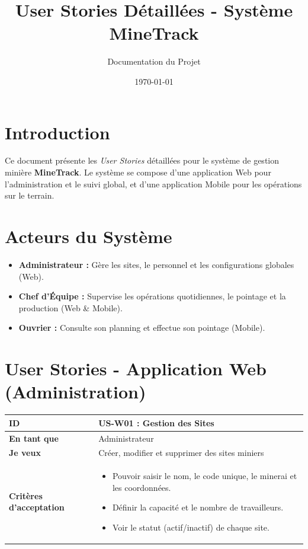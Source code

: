 \documentclass[12pt,a4paper]{article}
\title{\textbf{User Stories Détaillées - Système MineTrack}}
\author{Documentation du Projet}
\date{\today}
\begin{document}
\section{Introduction}
Ce document présente les \textit{User Stories} détaillées pour le système de gestion minière \textbf{MineTrack}. Le système se compose d'une application Web pour l'administration et le suivi global, et d'une application Mobile pour les opérations sur le terrain.

\section{Acteurs du Système}
\begin{itemize}[label=\textbullet]
    \item \textbf{Administrateur :} Gère les sites, le personnel et les configurations globales (Web).
    \item \textbf{Chef d'Équipe :} Supervise les opérations quotidiennes, le pointage et la production (Web \& Mobile).
    \item \textbf{Ouvrier :} Consulte son planning et effectue son pointage (Mobile).
\end{itemize}

\section{User Stories - Application Web (Administration)}

\begin{longtable}{|p{3cm}|p{12cm}|}
\hline
\textbf{ID} & \textbf{US-W01 : Gestion des Sites} \\ \hline
\textbf{En tant que} & Administrateur \\ \hline
\textbf{Je veux} & Créer, modifier et supprimer des sites miniers \\ \hline
\textbf{Critères d'acceptation} & 
\begin{itemize}[nosep, leftmargin=*]
    \item Pouvoir saisir le nom, le code unique, le minerai et les coordonnées.
    \item Définir la capacité et le nombre de travailleurs.
    \item Voir le statut (actif/inactif) de chaque site.
\end{itemize} \\ \hline
\end{longtable}
\end{document}
